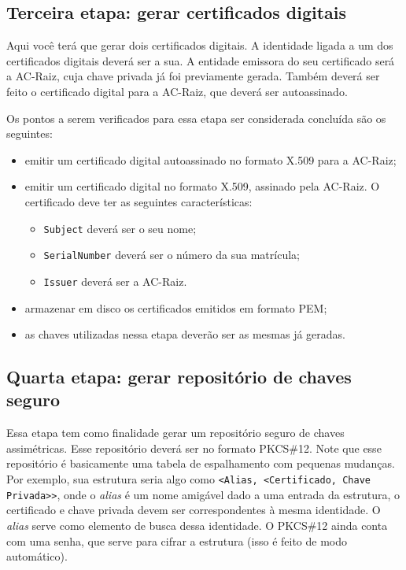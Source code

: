 \documentclass{article}
\begin{document}
\subsection{Terceira etapa: gerar certificados digitais}\label{subsec:step3}

Aqui você terá que gerar dois certificados digitais. A identidade ligada a um
dos certificados digitais deverá ser a sua. A entidade emissora do seu
certificado será a AC-Raiz, cuja chave privada já foi previamente
gerada. Também deverá ser feito o certificado digital para a AC-Raiz, que
deverá ser autoassinado.

Os pontos a serem verificados para essa etapa ser considerada concluída são os
seguintes:

\begin{itemize}
  \item emitir um certificado digital autoassinado no formato X.509 para
      a AC-Raiz;

  \item emitir um certificado digital no formato X.509, assinado pela
      AC-Raiz. O certificado deve ter as seguintes características:

  \begin{itemize}
    \item \texttt{Subject} deverá ser o seu nome;

    \item \texttt{SerialNumber} deverá ser o número da sua matrícula;

    \item \texttt{Issuer} deverá ser a AC-Raiz.
  \end{itemize}

  \item armazenar em disco os certificados emitidos em formato PEM;

  \item as chaves utilizadas nessa etapa deverão ser as mesmas já geradas.
\end{itemize}

\subsection{Quarta etapa: gerar repositório de chaves
seguro}\label{subsec:step4}

Essa etapa tem como finalidade gerar um repositório seguro de chaves
assimétricas. Esse repositório deverá ser no formato PKCS\#12. Note que esse
repositório é basicamente uma tabela de espalhamento com pequenas mudanças. Por
exemplo, sua estrutura seria algo como \texttt{<Alias, <Certificado, Chave
Privada>>}, onde o \textit{alias} é um nome amigável dado a uma entrada da
estrutura, o certificado e chave privada devem ser correspondentes à mesma
identidade. O \textit{alias} serve como elemento de busca dessa
identidade. O PKCS\#12 ainda conta com uma senha, que serve para cifrar
a estrutura (isso é feito de modo automático).
\end{document}
